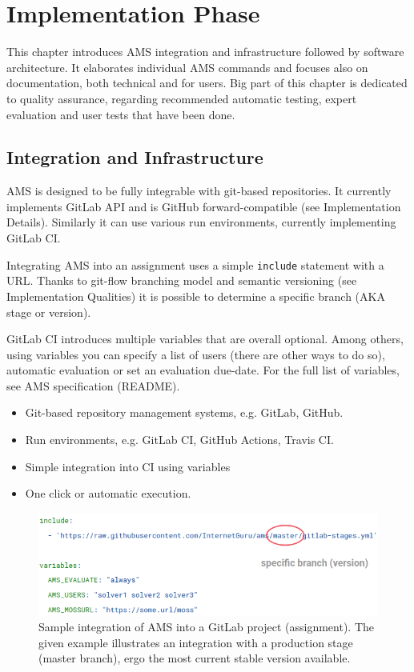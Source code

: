 \chapter{Implementation Phase} \label{chap:implementation}

{This chapter introduces AMS integration and infrastructure followed by software architecture. It elaborates individual AMS commands and focuses also on documentation, both technical and for users. Big part of this chapter is dedicated to quality assurance, regarding recommended automatic testing, expert evaluation and user tests that have been done.}

\section{Integration and Infrastructure}\label{sec:intandinf}

{AMS is designed to be fully integrable with git-based repositories. It currently implements GitLab API and is GitHub forward-compatible (see Implementation Details). Similarly it can use various run environments, currently implementing GitLab CI.}

{Integrating AMS into an assignment uses a simple \texttt{include} statement with a URL. Thanks to git-flow branching model and semantic versioning (see Implementation Qualities) it is possible to determine a specific branch (AKA stage or version).}

{GitLab CI introduces multiple variables that are overall optional. Among others, using variables you can specify a list of users (there are other ways to do so), automatic evaluation or set an evaluation due-date. For the full list of variables, see AMS specification (README).}

\begin{itemize}
\item
  {Git-based repository management systems, e.g. GitLab, GitHub.}
\item
  {Run environments, e.g. GitLab CI, GitHub Actions, Travis CI.}
\item
  {Simple integration into CI using variables}
\item
  {One click or automatic execution.}
\end{itemize}

\begin{figure}[H]
    \centering
    \includegraphics[width=\textwidth,height=\textheight,keepaspectratio]{Figures/impl/image7.png}
    \caption[Sample integration of AMS into a GitLab project (assignment).]{Sample integration of AMS into a GitLab project (assignment). The given example illustrates an integration with a production stage (master branch), ergo the most current stable version available.}
\end{figure}

